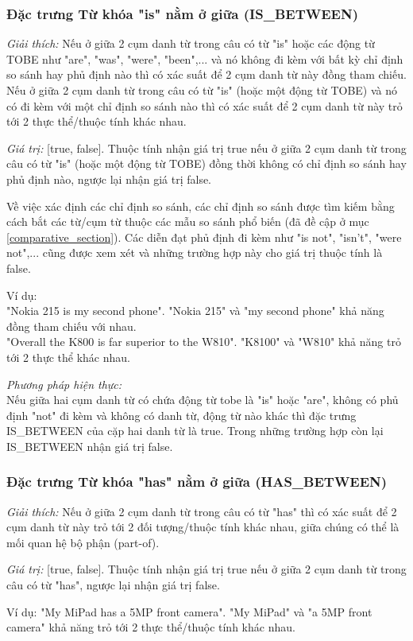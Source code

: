 \documentclass[12pt]{report}
\begin{document}
				\subsubsection*{Đặc trưng Từ khóa "is" nằm ở giữa (IS\_BETWEEN)}
					\par \textit{Giải thích:} Nếu ở giữa 2 cụm danh từ trong câu có từ "is" hoặc các động từ TOBE như "are", "was", "were", "been",... và nó không đi kèm với bất kỳ chỉ định so sánh hay phủ định nào thì có xác suất để 2 cụm danh từ này đồng tham chiếu. Nếu ở giữa 2 cụm danh từ trong câu có từ "is" (hoặc một động từ TOBE) và nó có đi kèm với một chỉ định so sánh nào thì có xác suất để 2 cụm danh từ này trỏ tới 2 thực thể/thuộc tính khác nhau.
					\par \textit{Giá trị:} [true, false]. Thuộc tính nhận giá trị true nếu ở giữa 2 cụm danh từ trong câu có từ "is" (hoặc một động từ TOBE) đồng thời không có chỉ định so sánh hay phủ định nào, ngược lại nhận giá trị false.
					\par Về việc xác định các chỉ định so sánh, các chỉ định so sánh được tìm kiếm bằng cách bắt các từ/cụm từ thuộc các mẫu so sánh phổ biến (đã đề cập ở mục \ref{comparative_section}). Các diễn đạt phủ định đi kèm như "is not", "isn't", "were not",... cũng được xem xét và những trường hợp này cho giá trị thuộc tính là false.
					\par Ví dụ: 
					\\"Nokia 215 is my second phone". "Nokia 215" và "my second phone" khả năng đồng tham chiếu với nhau.
					\\"Overall the K800 is far superior to the W810". "K8100" và "W810" khả năng trỏ tới 2 thực thể khác nhau.
					\par \textit{Phương pháp hiện thực:}
					\\Nếu giữa hai cụm danh từ có chứa động từ tobe là "is" hoặc "are", không có phủ định "not" đi kèm và không có danh từ, động từ nào khác thì đặc trưng IS\_BETWEEN của cặp hai danh từ là true. Trong những trường hợp còn lại IS\_BETWEEN nhận giá trị false.

				\subsubsection*{Đặc trưng Từ khóa "has" nằm ở giữa (HAS\_BETWEEN)}
					\par \textit{Giải thích:} Nếu ở giữa 2 cụm danh từ trong câu có từ "has" thì có xác suất để 2 cụm danh từ này trỏ tới 2 đối tượng/thuộc tính khác nhau, giữa chúng có thể là mối quan hệ bộ phận (part-of). 
					\par \textit{Giá trị:} [true, false]. Thuộc tính nhận giá trị true nếu ở giữa 2 cụm danh từ trong câu có từ "has", ngược lại nhận giá trị false.
					\par Ví dụ:
					"My MiPad has a 5MP front camera". "My MiPad" và "a 5MP front camera" khả năng trỏ tới 2 thực thể/thuộc tính khác nhau.
									
\end{document}
